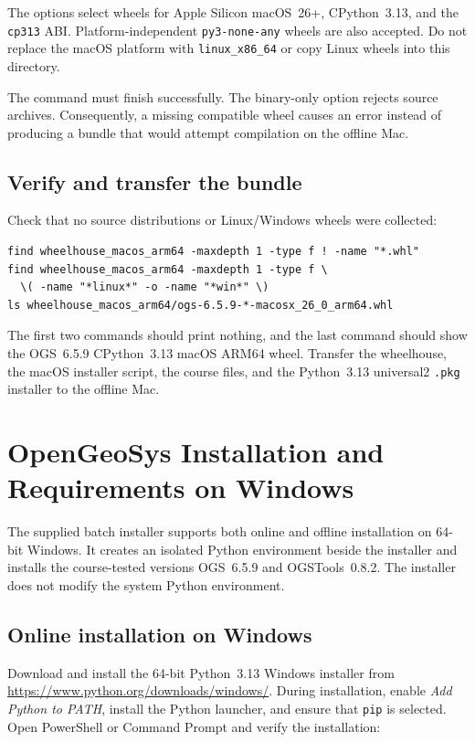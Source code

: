 \documentclass[11pt,a4paper]{tubaf-report}
\begin{document}
The options select wheels for Apple Silicon macOS~26+, CPython~3.13, and the
\texttt{cp313} ABI. Platform-independent \texttt{py3-none-any} wheels are also
accepted. Do not replace the macOS platform with \texttt{linux\_x86\_64} or
copy Linux wheels into this directory.

The command must finish successfully. The binary-only option rejects source
archives. Consequently, a missing compatible wheel causes an error instead of
producing a bundle that would attempt compilation on the offline Mac.

\section{Verify and transfer the bundle}

Check that no source distributions or Linux/Windows wheels were collected:

\begin{lstlisting}[style=terminal]
find wheelhouse_macos_arm64 -maxdepth 1 -type f ! -name "*.whl"
find wheelhouse_macos_arm64 -maxdepth 1 -type f \
  \( -name "*linux*" -o -name "*win*" \)
ls wheelhouse_macos_arm64/ogs-6.5.9-*-macosx_26_0_arm64.whl
\end{lstlisting}

The first two commands should print nothing, and the last command should show
the OGS~6.5.9 CPython~3.13 macOS ARM64 wheel. Transfer the wheelhouse, the
macOS installer script, the course files, and the Python~3.13 universal2
\texttt{.pkg} installer to the offline Mac.

\chapter{OpenGeoSys Installation and Requirements on Windows}

The supplied batch installer supports both online and offline installation on
64-bit Windows. It creates an isolated Python environment beside the installer
and installs the course-tested versions OGS~6.5.9 and OGSTools~0.8.2. The
installer does not modify the system Python environment.

\section{Online installation on Windows}

Download and install the 64-bit Python~3.13 Windows installer from
\url{https://www.python.org/downloads/windows/}. During installation, enable
\emph{Add Python to PATH}, install the Python launcher, and ensure that
\texttt{pip} is selected. Open PowerShell or Command Prompt and verify the
installation:
\end{document}
